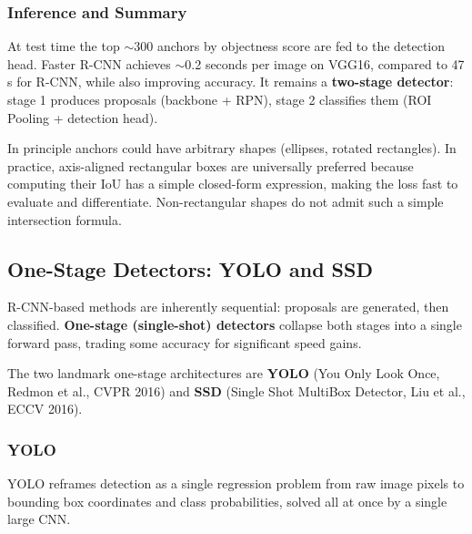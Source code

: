 \documentclass[11pt,a4paper]{article}
\newcommand{\term}[1]{\textcolor{DefGreen}{\textbf{#1}}}
\begin{document}
\subsubsection{Inference and Summary}

At test time the top $\sim$300 anchors by objectness score are fed to the detection head. Faster R-CNN achieves $\sim$0.2 seconds per image on VGG16, compared to 47 s for R-CNN, while also improving accuracy. It remains a \textbf{two-stage detector}: stage 1 produces proposals (backbone + RPN), stage 2 classifies them (ROI Pooling + detection head).

\begin{insightbox}
In principle anchors could have arbitrary shapes (ellipses, rotated rectangles). In practice, axis-aligned rectangular boxes are universally preferred because computing their IoU has a simple closed-form expression, making the loss fast to evaluate and differentiate. Non-rectangular shapes do not admit such a simple intersection formula.
\end{insightbox}

\subsection{One-Stage Detectors: YOLO and SSD}
\label{sec:yolo_ssd}

R-CNN-based methods are inherently sequential: proposals are generated, then classified. \term{One-stage (single-shot) detectors} collapse both stages into a single forward pass, trading some accuracy for significant speed gains.

The two landmark one-stage architectures are \textbf{YOLO} (You Only Look Once, Redmon et al., CVPR 2016) and \textbf{SSD} (Single Shot MultiBox Detector, Liu et al., ECCV 2016).

\subsubsection{YOLO}

YOLO reframes detection as a single regression problem from raw image pixels to bounding box coordinates and class probabilities, solved all at once by a single large CNN.
\end{document}
